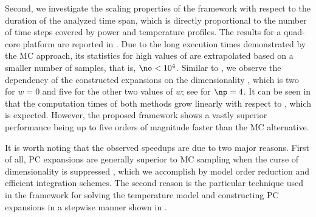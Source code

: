 Second, we investigate the scaling properties of the framework with respect to
the duration of the analyzed time span, which is directly proportional to the
number of time steps \ns covered by power and temperature profiles. The results
for a quad-core platform are reported in . Due
to the long execution times demonstrated by the \ac{MC} approach, its statistics
for high values of \ns are extrapolated based on a smaller number of samples,
that is, $\no < 10^4$. Similar to , we
observe the dependency of the constructed expansions on the dimensionality \nz,
which is two for $w = 0$ and five for the other two values of $w$; see
 for $\np = 4$. It can be seen in
 that the computation times of both methods
grow linearly with respect to \ns, which is expected. However, the proposed
framework shows a vastly superior performance being up to five orders of
magnitude faster than the \ac{MC} alternative.

It is worth noting that the observed speedups are due to two major reasons.
First of all, \ac{PC} expansions are generally superior to \ac{MC} sampling when
the curse of dimensionality is suppressed \cite{eldred2008, xiu2010}, which we
accomplish by model order reduction and efficient integration schemes. The
second reason is the particular technique used in the framework for solving the
temperature model and constructing \ac{PC} expansions in a stepwise manner shown
in .
